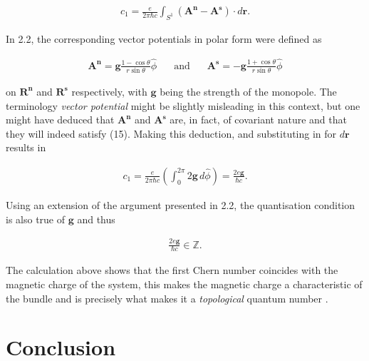 \documentclass[fleqn, twocolumn, 10pt]{article}
\begin{document}
\begin{ceqn}
\begin{align*}
c_1 = \frac{e}{2\pi \hbar c} \int_{S^1}\left(\mathbf{A^n} - \mathbf{A^s}\right)\cdot d\mathbf{r}.
\end{align*}
\end{ceqn}
In 2.2, the corresponding vector potentials in polar form were defined as 

\begin{ceqn}
\begin{align*}
\mathbf{A^n} = \bm{g}\frac{1 - \cos\theta}{r\sin\theta}\hat\phi \;\;\;\;\;\text{ and }\;\;\;\;\; \mathbf{A^s} = -\bm{g}\frac{1 + \cos\theta}{r\sin\theta}\hat\phi
\end{align*}
\end{ceqn}
on $\mathbf{R^n}$ and $\mathbf{R^s}$ respectively, with $\bm{g}$ being the strength of the monopole. The terminology \textit{vector potential} might be slightly misleading in this context, but one might have deduced that $\mathbf{A^n}$ and $\mathbf{A^s}$ are, in fact, of covariant nature and that they will indeed satisfy (15). Making this deduction, and substituting in for $d\mathbf{r}$ results in

\begin{ceqn}
\begin{align*}
c_1 = \frac{e}{2\pi \hbar c}\left(\int_{0}^{2\pi} 2\bm{g}\,d\hat\phi\right) = \frac{2e\bm{g}}{\hbar c}.
\end{align*}
\end{ceqn}
Using an extension of the argument presented in 2.2, the quantisation condition is also true of $\bm{g}$ and thus

\begin{ceqn}
\begin{align*}
\frac{2e\bm{g}}{\hbar c} \in \mathbb{Z}.
\end{align*}
\end{ceqn}

The calculation above shows that the first Chern number coincides with the magnetic charge of the system, this makes the magnetic charge a characteristic of the bundle and is precisely what makes it a \textit{topological} quantum number \cite{shnir,  kai2015lam, naber1997topology, lawrie2017maths3}. 


\section{Conclusion}
\end{document}
